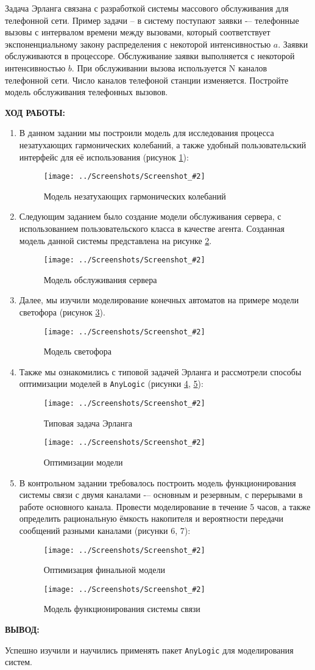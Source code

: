 \documentclass[14pt,a4paper]{extreport}
\newcommand{\sshot}[2]{\begin{figure}[ht]%
\centering\texttt{[image: ../Screenshots/Screenshot\_\#2]}%
\caption{#1}%
\label{sshot#2}%
\end{figure}%
}
\newcommand{\header}[1]{%
{
\clearpage%
\fontsize{16pt}{14pt}\selectfont
\begin{center}
\textbf{\MakeUppercase{#1}:}
\end{center}
}
}
\newcommand{\anylogic}{\texttt{AnyLogic}}
\begin{document}
Задача Эрланга связана с разработкой системы массового обслуживания для телефонной сети. Пример задачи -- в систему поступают заявки -– телефонные вызовы с интервалом времени между вызовами, который соответствует экспоненциальному закону распределения с некоторой интенсивностью $a$. Заявки обслуживаются в процессоре. Обслуживание заявки выполняется с некоторой интенсивностью $b$. При обслуживании вызова используется N каналов телефонной сети. Число каналов телефоной станции изменяется. Постройте модель обслуживания телефонных вызовов.

\header{Ход работы}

\begin{enumerate}

\item В данном задании мы построили модель для исследования процесса незатухающих гармонических колебаний, а также удобный пользовательский интерфейс для её использования (рисунок \ref{sshot1}):

\sshot{Модель незатухающих гармонических колебаний}{1}

\clearpage

\item Следующим заданием было создание модели обслуживания сервера, с использованием пользовательского класса в качестве агента. Созданная модель данной системы представлена на рисунке \ref{sshot2}.

\sshot{Модель обслуживания сервера}{2}

\clearpage

\item Далее, мы изучили моделирование конечных автоматов на примере модели светофора (рисунок \ref{sshot3}).

\sshot{Модель светофора}{3}

\clearpage

\item Также мы ознакомились с типовой задачей Эрланга и рассмотрели способы оптимизации моделей в \anylogic {} (рисунки \ref{sshot4}, \ref{sshot5}):

\sshot{Типовая задача Эрланга}{4}
\sshot{Оптимизации модели}{5}

\clearpage

\item В контрольном задании требовалось построить модель функционирования системы связи с двумя каналами -– основным и резервным, с перерывами в работе основного канала. Провести моделирование в течение 5 часов, а также определить рациональную ёмкость накопителя и вероятности передачи сообщений разными каналами (рисунки 6, 7):

\sshot{Оптимизация финальной модели}{6}
\sshot{Модель функционирования системы связи}{7}

\end{enumerate}

\header{Вывод}

Успешно изучили и научились применять пакет \anylogic {} для моделирования систем.
\end{document}
